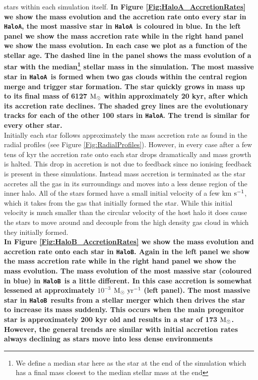 \documentclass[twocolumn,iop,revtex4]{openjournal}
\newcommand{\kms} {km $\rm{s^{-1}}$}
\newcommand{\msolar} {$\rm{M_{\odot}}~$}
\newcommand{\msolarc} {$\rm{M_{\odot}}$}
\newcommand{\msolaryr} {$\rm{M_{\odot}~yr^{-1}}~$}
\newcommand{\ha} {\texttt{HaloA~}}
\newcommand{\hb} {\texttt{HaloB~}}
\newcommand{\hac} {\texttt{HaloA}}
\newcommand{\hbc} {\texttt{HaloB}}
\begin{document}
stars within each simulation itself. \textbf{In Figure \ref{Fig:HaloA_AccretionRates} we show the mass evolution and
the accretion rate onto every star in \hac, the most massive star in \ha is coloured in blue.
In the left panel we show the mass accretion rate while in the right hand panel we show the mass evolution.
In each case we plot as a function of the stellar age. The dashed line in the panel shows the mass evolution
of a star with the median\footnote{We define a
        median star here as the star at the end of the simulation which has a final mass
        closest to the median stellar mass at the end} stellar mass in the simulation.
The most massive star in \ha is formed
when two gas clouds within the central region merge and trigger star formation. The star quickly
grows in mass up to its final mass of 6127 \msolar within approximately 20 kyr, after which
its accretion rate declines. The shaded grey lines are the evolutionary tracks for each of the
other 100 stars in \hac. The trend is similar for every other star.\\} 
\indent Initially each star follows approximately the mass accretion rate as found in the radial profiles (see Figure \ref{Fig:RadialProfiles}).
However, in every case after a few tens of kyr the accretion rate onto each star drops dramatically and mass growth is halted.
This drop in accretion is not due to feedback since no ionising feedback
is present in these simulations. Instead mass accretion is terminated as the star accretes all the gas in
its surroundings and moves into a less dense region of the inner halo. All of the stars formed have a small initial velocity of a few \kms,
which it takes from the gas that initially formed the star. While this 
initial velocity is much smaller than the circular
velocity of the host halo it does cause the stars to move around and decouple from the high density gas cloud in which they initially formed. \\
\indent \textbf{In Figure \ref{Fig:HaloB_AccretionRates} we show the mass evolution and accretion rate onto each star in \hbc.
  Again in the left panel we show the mass accretion rate while in the right hand panel we show the mass evolution.
  The mass evolution of the most massive star (coloured in blue) in \hb is a little different. In this case accretion is somewhat lessened
  at approximately $10^{-3}$ \msolaryr (left panel). The most
  massive star in \hb results from a stellar merger which then drives the star to increase its mass suddenly. This occurs
  when the main progenitor star is approximately 200 kyr old and results in a star of 173 \msolarc. However, the general
trends are similar with initial accretion rates always declining as stars move into less dense environments}\\
\end{document}
